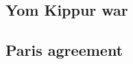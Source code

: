 \subsection{Yom Kippur war}
\label{sec:yom_kippur_war}

\subsection{Paris agreement}
\label{sec:paris_agreement}

